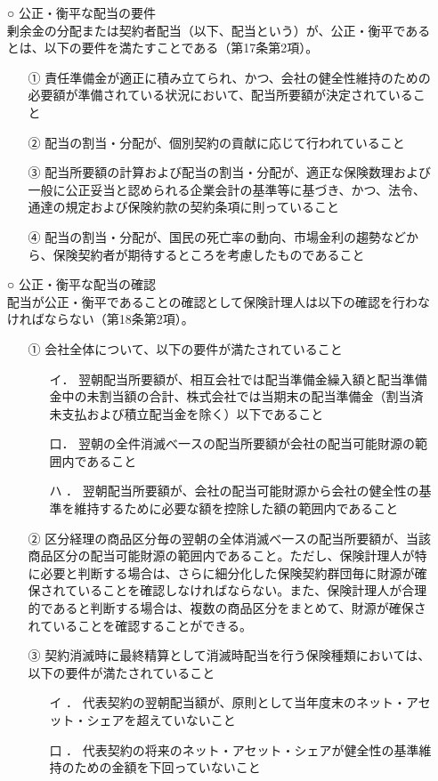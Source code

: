 \documentclass[report,gutter=10mm,fore-edge=10mm,uplatex,dvipdfmx]{jlreq}
\begin{document}
\begin{itemize}
\item[○] 公正・衡平な配当の要件\\
剰余金の分配または契約者配当（以下、配当という）が、公正・衡平であるとは、以下の要件を満たすことである（第17条第2項）。
\begin{itemize}
\item[①] 責任準備金が適正に積み立てられ、かつ、会社の健全性維持のための必要額が準備されている状況において、配当所要額が決定されていること
\item[②] 配当の割当・分配が、個別契約の貢献に応じて行われていること
\item[③] 配当所要額の計算および配当の割当・分配が、適正な保険数理および一般に公正妥当と認められる企業会計の基準等に基づき、かつ、法令、通達の規定および保険約款の契約条項に則っていること
\item[④] 配当の割当・分配が、国民の死亡率の動向、市場金利の趨勢などから、保険契約者が期待するところを考慮したものであること
\end{itemize}
\item[○] 公正・衡平な配当の確認\\
配当が公正・衡平であることの確認として保険計理人は以下の確認を行わなければならない（第18条第2項）。
\begin{itemize}
\item[①] 会社全体について、以下の要件が満たされていること
\begin{itemize}
\item[イ．] 翌朝配当所要額が、相互会社では配当準備金繰入額と配当準備金中の未割当額の合計、株式会社では当期末の配当準備金（割当済未支払および積立配当金を除く）以下であること
\item[口．] 翌朝の全件消滅べ一スの配当所要額が会社の配当可能財源の範囲内であること
\item[ハ ．] 翌朝配当所要額が、会社の配当可能財源から会社の健全性の基準を維持するために必要な額を控除した額の範囲内であること
\end{itemize}
\item[②] 区分経理の商品区分毎の翌朝の全体消滅べ一スの配当所要額が、当該商品区分の配当可能財源の範囲内であること。ただし、保険計理人が特に必要と判断する場合は、さらに細分化した保険契約群団毎に財源が確保されていることを確認しなければならない。また、保険計理人が合理的であると判断する場合は、複数の商品区分をまとめて、財源が確保されていることを確認することができる。
\item[③] 契約消滅時に最終精算として消滅時配当を行う保険種類においては、以下の要件が満たされていること
\begin{itemize}
\item[イ ．] 代表契約の翌朝配当額が、原則として当年度末のネット・アセット・シェアを超えていないこと
\item[口 ．] 代表契約の将来のネット・アセット・シェアが健全性の基準維持のための金額を下回っていないこと
\end{itemize}
\end{itemize}
\end{itemize}
\end{document}
